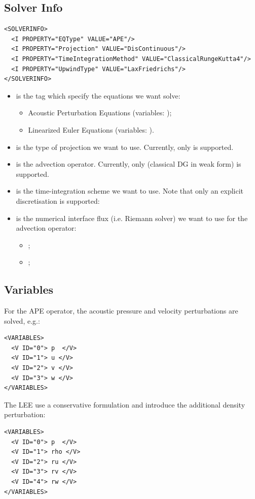 \subsection{Solver Info}
\begin{lstlisting}[style=XmlStyle]
<SOLVERINFO>
  <I PROPERTY="EQType" VALUE="APE"/>
  <I PROPERTY="Projection" VALUE="DisContinuous"/>
  <I PROPERTY="TimeIntegrationMethod" VALUE="ClassicalRungeKutta4"/>
  <I PROPERTY="UpwindType" VALUE="LaxFriedrichs"/>
</SOLVERINFO>
\end{lstlisting}
\begin{itemize}
    \item {} is the tag which specify the equations we want solve:
    \begin{itemize}
        \item {} Acoustic Perturbation Equations (variables: );
        \item {} Linearized Euler Equations (variables: ).
    \end{itemize}
    \item {} is the type of projection we want to use. Currently, only  is supported.
    \item {} is the advection operator. Currently, only  (classical DG in weak form) is supported.
    \item {} is the time-integration scheme we want to use. 
    Note that only an explicit discretisation is supported:
    \item {} is the numerical interface flux (i.e. Riemann solver) 
    we want to use for the advection operator:
    \begin{itemize}
        \item {};
        \item {}; 
    \end{itemize}
\end{itemize}

\subsection{Variables}
For the APE operator, the acoustic pressure and velocity perturbations are solved, e.g.:
\begin{lstlisting}[style=XmlStyle]
<VARIABLES>
  <V ID="0"> p  </V>
  <V ID="1"> u </V>
  <V ID="2"> v </V>
  <V ID="3"> w </V>
</VARIABLES>
\end{lstlisting}
The LEE use a conservative formulation and introduce the additional density perturbation:
\begin{lstlisting}[style=XmlStyle]
<VARIABLES>
  <V ID="0"> p  </V>
  <V ID="1"> rho </V>
  <V ID="2"> ru </V>
  <V ID="3"> rv </V>
  <V ID="4"> rw </V>
</VARIABLES>
\end{lstlisting}


